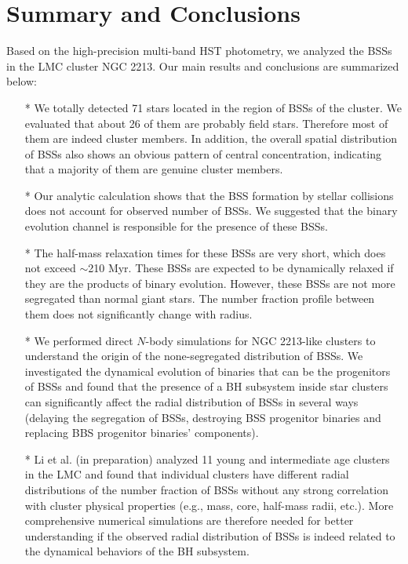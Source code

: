 \documentclass[useAMS,usenatbib,twocolumn]{mnras}
\begin{document}
\section{Summary and Conclusions}\label{S6}	
Based on the high-precision multi-band HST photometry, we analyzed the BSSs in the LMC cluster NGC 2213. Our main results and conclusions are summarized below:
\begin{itemize}
\item[*] We totally detected 71 stars located in the region of BSSs of the cluster. We evaluated that about 26 of them are probably field stars. Therefore most of them are indeed cluster members. In addition, the overall spatial distribution of BSSs also shows an obvious pattern of central concentration, indicating that a majority of them are genuine cluster members. 
\item[*] Our analytic calculation shows that the BSS formation by stellar collisions does not account for observed number of BSSs. We suggested that the binary evolution channel is responsible for the presence of these BSSs.
\item[*] The half-mass relaxation times for these BSSs are very short, which does not exceed $\sim$210 Myr. These BSSs are expected to be dynamically relaxed if they are the products of binary evolution. However, these BSSs are not more segregated than normal giant stars. The number fraction profile between them does not significantly change with radius.
\item[*] We performed direct $N$-body simulations for NGC 2213-like clusters to understand the origin of the none-segregated distribution of BSSs. We investigated the dynamical evolution of binaries that can be the progenitors of BSSs and found that the presence of a BH subsystem inside star clusters can significantly affect the radial distribution of BSSs in several ways (delaying the segregation of BSSs, destroying BSS progenitor binaries and replacing BBS progenitor binaries' components). 
\item[*] Li et al. (in preparation) analyzed 11 young and intermediate age clusters in the LMC and found that individual clusters have different radial distributions of the number fraction of BSSs without any strong correlation with cluster physical properties (e.g., mass, core, half-mass radii, etc.). More comprehensive numerical simulations are therefore needed for better understanding if the observed radial distribution of BSSs is indeed related to the dynamical behaviors of the BH subsystem.
\end{itemize}
\end{document}
